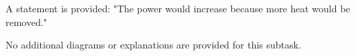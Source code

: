A statement is provided:  
"The power would increase because more heat would be removed."  

No additional diagrams or explanations are provided for this subtask.